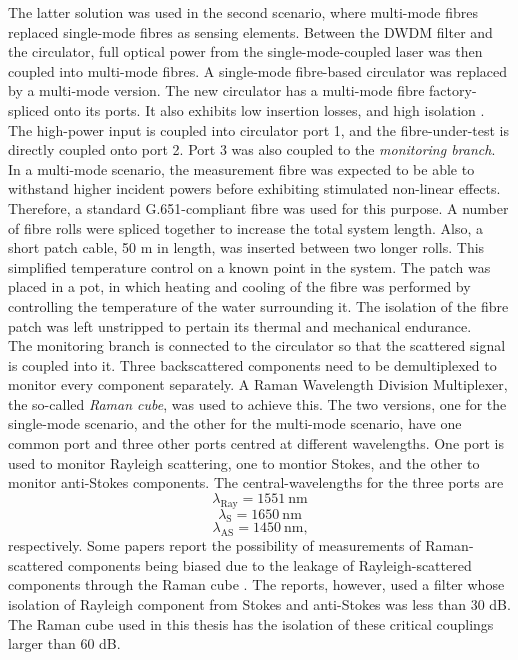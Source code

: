 \documentclass{standalone}
\begin{document}
The latter solution was used in the second scenario, where multi-mode fibres replaced single-mode fibres as sensing elements. Between the DWDM filter and the circulator, full optical power from the single-mode-coupled laser was then coupled into multi-mode fibres. A single-mode fibre-based circulator was replaced by a multi-mode version. The new circulator has a multi-mode fibre factory-spliced onto its ports. It also exhibits low insertion losses, and high isolation \cite{datasheet:mmf_circulator}. The high-power input is coupled into circulator port 1, and the fibre-under-test is directly coupled onto port 2. Port 3 was also coupled to the \textit{monitoring branch}. In a multi-mode scenario, the measurement fibre was expected to be able to withstand higher incident powers before exhibiting stimulated non-linear effects. Therefore, a standard G.651-compliant fibre was used for this purpose. A number of fibre rolls were spliced together to increase the total system length. Also, a short patch cable, 50 m in length, was inserted between two longer rolls. This simplified temperature control on a known point in the system. The patch was placed in a pot, in which heating and cooling of the fibre was performed by controlling the temperature of the water surrounding it. The isolation of the fibre patch was left unstripped to pertain its thermal and mechanical endurance. \\

The monitoring branch is connected to the circulator so that the scattered signal is coupled into it. Three backscattered components need to be demultiplexed to monitor every component separately. A Raman Wavelength Division Multiplexer, the so-called \textit{Raman cube}, was used to achieve this. The two versions, one for the single-mode scenario, and the other for the multi-mode scenario, have one common port and three other ports centred at different wavelengths. One port is used to monitor Rayleigh scattering, one to montior Stokes, and the other to monitor anti-Stokes components. The central-wavelengths for the three ports are
\begin{equation}
\lambda_\textrm{Ray} = \SI{1551}{\nano \meter}
\end{equation}
\begin{equation}
\lambda_\textrm{S} = \SI{1650}{\nano \meter}
\end{equation}
\begin{equation}
\lambda_\textrm{AS} = \SI{1450}{\nano \meter} \textrm{,}
\end{equation}
respectively. Some papers report the possibility of measurements of Raman-scattered components being biased due to the leakage of Rayleigh-scattered components through the Raman cube \cite{rayleigh_leakage}. The reports, however, used a filter whose isolation of Rayleigh component from Stokes and anti-Stokes was less than 30 dB. The Raman cube used in this thesis has the isolation of these critical couplings larger than 60 dB.
\end{document}
